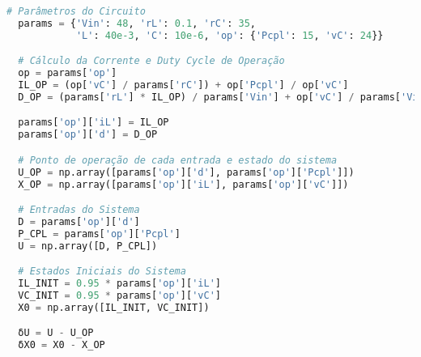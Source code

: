\vspace{8pt}
\begin{lstlisting}[language=Python, caption={Parâmetros do conversor Buck.}, label=cod:buck_params]
  # Parâmetros do Circuito
  params = {'Vin': 48, 'rL': 0.1, 'rC': 35,
            'L': 40e-3, 'C': 10e-6, 'op': {'Pcpl': 15, 'vC': 24}}

  # Cálculo da Corrente e Duty Cycle de Operação
  op = params['op']
  IL_OP = (op['vC'] / params['rC']) + op['Pcpl'] / op['vC']
  D_OP = (params['rL'] * IL_OP) / params['Vin'] + op['vC'] / params['Vin']

  params['op']['iL'] = IL_OP
  params['op']['d'] = D_OP

  # Ponto de operação de cada entrada e estado do sistema
  U_OP = np.array([params['op']['d'], params['op']['Pcpl']])
  X_OP = np.array([params['op']['iL'], params['op']['vC']])

  # Entradas do Sistema
  D = params['op']['d']
  P_CPL = params['op']['Pcpl']
  U = np.array([D, P_CPL])

  # Estados Iniciais do Sistema
  IL_INIT = 0.95 * params['op']['iL']
  VC_INIT = 0.95 * params['op']['vC']
  X0 = np.array([IL_INIT, VC_INIT])

  δU = U - U_OP
  δX0 = X0 - X_OP
\end{lstlisting}

